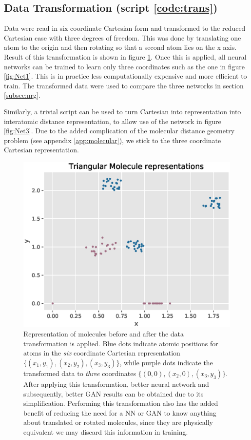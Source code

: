 \documentclass[12pt,a4paper]{article}
\begin{document}
\subsection{Data Transformation (script \ref{code:trans})} \label{subsec:trans}
Data were read in six coordinate Cartesian form and transformed to the reduced Cartesian case with three degrees of freedom. This was done by translating one atom to the origin and then rotating so that a second atom lies on the x axis. Result of this transformation is shown in figure \ref{fig:transformation}. Once this is applied, all neural networks can be trained to learn only three coordinates such as the one in figure \ref{fig:Net1}. This is in practice less computationally expensive and more efficient to train. The transformed data were used to compare the three networks in section \ref{subsec:nrg}.

Similarly, a trivial script can be used to turn Cartesian into representation into interatomic distance representation, to allow use of the network in figure \ref{fig:Net3}. Due to the added complication of the molecular distance geometry problem (see appendix \ref{app:molecular}), we stick to the three coordinate Cartesian representation.
\begin{figure}[h!]
    \centering
    \includegraphics[width = 0.5\linewidth]{images/transformation.eps}
    \caption{Representation of molecules before and after the data transformation is applied. Blue dots indicate atomic positions for atoms in the \emph{six} coordinate Cartesian representation $\{(x_1,y_1), (x_2,y_2), (x_3,y_3)\}$, while purple dots indicate the transformed data to \emph{three} coordinates $\{(0,0), (x_2,0), (x_3,y_3)\}$. After applying this transformation, better neural network and subsequently, better GAN results can be obtained due to its simplification. Performing this transformation also has the added benefit of reducing the need for a NN or GAN to know anything about translated or rotated molecules, since they are physically equivalent we may discard this information in training.}
    \label{fig:transformation}
    \pagebreak
\end{figure}
\end{document}
